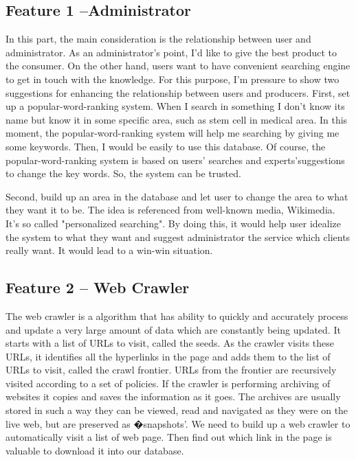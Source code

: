 \documentclass[a4paper]{article} %
\begin{document}
	\subsection*{Feature 1 --Administrator}
	\label{task1:part1}
	
	In this part, the main consideration is the relationship between user and administrator. As an administrator's point, I'd like to give the best product to the consumer. On the other hand, users want to have convenient searching engine to get in touch with the knowledge. For this purpose, I'm pressure to show two suggestions for enhancing the relationship between users and producers. First, set up a popular-word-ranking system. When I search in something I don't know its name but know it in some specific area, such as stem cell in medical area. In this moment, the popular-word-ranking system will help me searching by giving me some keywords. Then, I would be easily to use this database. Of course, the popular-word-ranking system is based on users' searches and experts'suggestions to change the key words. So, the system can be trusted. 
	
	Second, build up an area in the database and let user to change the area to what they want it to be. The idea is referenced from well-known media, Wikimedia. It's so called "personalized searching". By doing this, it would help user idealize the system to what they want and suggest administrator the service which clients really want. It would lead to a win-win situation.
	
	\subsection*{Feature 2 -- Web Crawler}
	\label{task1:feature2}
	
	The web crawler is a algorithm that has ability to quickly and accurately process and update a very large amount of data which are constantly being updated.\cite{Liu2012} It starts with a list of URLs to visit, called the seeds. As the crawler visits these URLs, it identifies all the hyperlinks in the page and adds them to the list of URLs to visit, called the crawl frontier. URLs from the frontier are recursively visited according to a set of policies. If the crawler is performing archiving of websites it copies and saves the information as it goes. The archives are usually stored in such a way they can be viewed, read and navigated as they were on the live web, but are preserved as �snapshots'.\cite{Du2013} We need to build up a web crawler to automatically visit a list of web page. Then find out which link in the page is valuable to download it into our database. 
	
\end{document}
